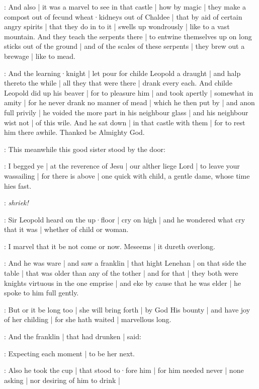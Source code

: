 :
And also |
it was a marvel to see in that castle |
how by magic |
they make a compost out of fecund wheat·kidneys out of Chaldee |
that by aid of certain angry spirits |
that they do in to it |
swells up wondrously |
like to a vast mountain.
And they teach the serpents there |
to entwine themselves up on long sticks out of the ground |
and of the scales of these serpents |
they brew out a brewage |
like to mead.


:
And the learning·knight |
let pour for childe Leopold a draught |
and halp thereto the while |
all they that were there |
drank every each.
And childe Leopold did up his beaver |
for to pleasure him |
and took apertly |
somewhat in amity |
for he never drank no manner of mead |
which he then put by |
and anon full privily |
he voided the more part in his neighbour glass |
and his neighbour wist not |
of this wile.
And he sat down |
in that castle with them |
for to rest him there awhile.
Thanked be Almighty God.



:
This meanwhile this good sister stood by the door:

\nursecallan:
I begged ye |
at the reverence of Jesu |
our alther liege Lord |
to leave your wassailing |
for there is above |
one quick with child,
a gentle dame,
whose time hies fast.

\All:
\emph{shriek!}

:
Sir Leopold heard on the up·floor |
cry on high |
and he wondered what cry that it was |
whether of child or woman.

\Bloom:
I marvel that it be not come or now.
Meseems |
it dureth overlong.

:
And he was ware |
and saw a franklin |
that hight Lenehan |
on that side the table |
that was older than any of the tother |
and for that |
they both were knights virtuous in the one emprise |
and eke by cause that he was elder |
he spoke to him full gently.

\Bloom:
But or it be long too |
she will bring forth |
by God His bounty |
and have joy of her childing |
for she hath waited |
marvellous long.

:
And the franklin |
that had drunken |
said:

\lenehan:
Expecting each moment |
to be her next.

:
Also he took the cup |
that stood to·fore him |
for him needed never |
none asking |
nor desiring of him to drink |

